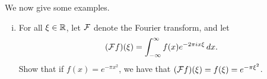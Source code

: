\newpage
\noindent We now give some examples.
\begin{enumerate}[(i)]
    \item For all $\xi \in \mathbb R$, let $\mathcal F$ denote the Fourier transform, and let
    \[ (\mathcal F f)(\xi) = \int_{-\infty}^\infty f(x) e^{-2\pi i x \xi} \, dx. \]
    Show that if $f(x) = e^{-\pi x^2}$, we have that $(\mathcal F f)(\xi) = f(\xi) = e^{-\pi \xi^2}$.
    \begin{solution}
        
    \end{solution}

\end{enumerate}
